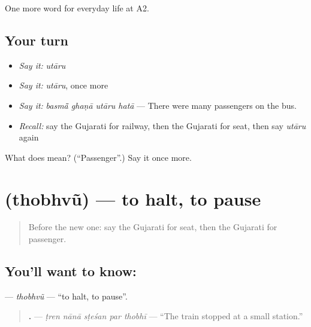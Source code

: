 \begin{grammarlens}[title={What you've built}]
One more word for everyday life at A2.
\end{grammarlens}

\subsection*{Your turn}
\begin{itemize}
\raggedright
  \item \emph{Say it:} \emph{utāru}
  \item \emph{Say it:} \emph{utāru}, once more
  \item \emph{Say it:} \emph{basmā̃ ghaṇā utāru hatā} — There were many passengers on the bus.
  \item \emph{Recall:} say the Gujarati for railway, then the Gujarati for seat, then say \emph{utāru} again
\end{itemize}

\begin{tcolorbox}[breakable,colback=teal!4,colframe=teal!35!black,title={Before you move on}]
What does  mean? (\textquotedblleft{}Passenger\textquotedblright{}.) Say it once more.
\end{tcolorbox}
\section[\texorpdfstring{\gu{થોભવું} (thobhvũ)}{થોભવું (thobhvũ)}]{ (thobhvũ) — to halt, to pause}

\label{lesson:GU-C205-thobhvu}



\begin{quote}
Before the new one: say the Gujarati for seat, then the Gujarati for passenger.
\end{quote}

\subsection*{You'll want to know: }
\textbf{} — \emph{thobhvũ} — \textquotedblleft{}to halt, to pause\textquotedblright{}.

\begin{quote}
\textbf{    .} — \emph{ṭren nānā sṭeśan par thobhī} — \textquotedblleft{}The train stopped at a small station.\textquotedblright{}
\end{quote}

